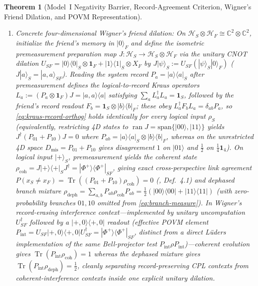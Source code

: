 \documentclass[11pt,a4paper]{article}
\newtheorem{theorem}{Theorem}
\theoremstyle{definition}
\theoremstyle{remark}
\newcommand{\Tr}{\operatorname{Tr}}
\newcommand{\cH}{\mathcal{H}}
\newcommand{\bbC}{\mathbb{C}}
\newcommand{\1}{\mathbf{1}}
\begin{document}
\begin{theorem}[Model~I Negativity Barrier, Record-Agreement Criterion, Wigner's Friend Dilation, and POVM Representation]
\begin{enumerate}
\begin{enumerate}
    \item[(b.2)] \emph{Concrete four-dimensional Wigner's friend dilation:} On $\cH_S\otimes\cH_F\cong\bbC^2\otimes\bbC^2$, initialize the friend's memory in $|0\rangle_F$ and define the isometric premeasurement preparation map $J:\cH_S\to\cH_S\otimes\cH_F$ via the unitary CNOT dilation $U_{SF}=|0\rangle\langle 0|_S\otimes\1_F + |1\rangle\langle 1|_S\otimes X_F$ by $J|\psi\rangle_S := U_{SF}(|\psi\rangle_S|0\rangle_F)$ ($J|a\rangle_S=|a,a\rangle_{SF}$). Reading the system record $P_a=|a\rangle\langle a|_S$ after premeasurement defines the logical-to-record Kraus operators $L_a:=(P_a\otimes\1_F)J=|a,a\rangle\langle a|$ satisfying $\sum_a L_a^\dagger L_a=\1_S$, followed by the friend's record readout $F_b=\1_S\otimes|b\rangle\langle b|_F$; these obey $L_a^\dagger F_b L_a=\delta_{ab}P_a$, so \eqref{eq:kraus-record-orthog} holds identically for \emph{every} logical input $\rho_S$ (equivalently, restricting 4D states to $\operatorname{ran} J=\mathrm{span}\{|00\rangle,|11\rangle\}$ yields $J^\dagger(P_{01}+P_{10})J=0$ where $P_{ab}=|a\rangle\langle a|_S\otimes|b\rangle\langle b|_F$, whereas on the unrestricted 4D space $D_{\mathrm{mis}}=P_{01}+P_{10}$ gives disagreement $1$ on $|01\rangle$ and $\frac{1}{2}$ on $\frac{1}{4}\1_4$). On logical input $|+\rangle_S$, premeasurement yields the coherent state $\rho_{\mathrm{coh}}=J|+\rangle\langle +|_S J^\dagger = |\Phi^+\rangle\langle\Phi^+|_{SF}$, giving exact cross-perspective link agreement $P(x_S\neq x_F)=\Tr((P_{01}+P_{10})\rho_{\mathrm{coh}})=0$ (\cite{AdlamRovelli2022}, Def.~4.1) and dephased branch mixture $\rho_{\mathrm{deph}}=\sum_{a,b}P_{ab}\rho_{\mathrm{coh}}P_{ab}=\frac{1}{2}(|00\rangle\langle 00|+|11\rangle\langle 11|)$ (with zero-probability branches $01,10$ omitted from \eqref{eq:branch-measure}). In Wigner's \emph{record-erasing interference context}---implemented by unitary uncomputation $U_{SF}^\dagger$ followed by a $|+,0\rangle\langle +,0|$ readout (effective POVM element $P_{\mathrm{int}}=U_{SF}|+,0\rangle\langle +,0|U_{SF}^\dagger=|\Phi^+\rangle\langle\Phi^+|_{SF}$, distinct from a direct L\"uders implementation of the same Bell-projector test $P_{\mathrm{int}}\rho P_{\mathrm{int}}$)---coherent evolution gives $\Tr(P_{\mathrm{int}}\rho_{\mathrm{coh}})=1$ whereas the dephased mixture gives $\Tr(P_{\mathrm{int}}\rho_{\mathrm{deph}})=\frac{1}{2}$, cleanly separating record-preserving CPL contexts from coherent-interference contexts inside one explicit unitary dilation.

\end{enumerate}
\end{enumerate}
\end{theorem}
\end{document}
